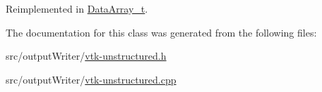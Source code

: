 Reimplemented in \hyperlink{classDataArray__t_a0ba3569846912b9fcadbd942e914cce1}{Data\+Array\+\_\+t}.



The documentation for this class was generated from the following files\+:\begin{DoxyCompactItemize}
\item 
src/output\+Writer/\hyperlink{vtk-unstructured_8h}{vtk-\/unstructured.\+h}\item 
src/output\+Writer/\hyperlink{vtk-unstructured_8cpp}{vtk-\/unstructured.\+cpp}\end{DoxyCompactItemize}
